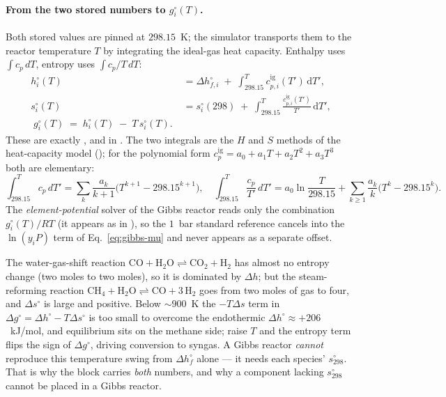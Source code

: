\documentclass[11pt,a4paper]{article}
\begin{document}
\paragraph{From the two stored numbers to $g^{\circ}_i(T)$.}
Both stored values are pinned at $298.15$~K; the simulator transports
them to the reactor temperature $T$ by integrating the ideal-gas heat
capacity.  Enthalpy uses $\int c_p\,dT$, entropy uses
$\int c_p/T\,dT$:
\begin{align}
   h^{\circ}_i(T) &= \Delta h^{\circ}_{f,i}
        \;+\; \int_{298.15}^{T} c_{p,i}^{\mathrm{ig}}(T')\,\mathrm{d}T',
        \label{eq:gibbs-h-of-T}\\[2pt]
   s^{\circ}_i(T) &= s^{\circ}_{i}(298)
        \;+\; \int_{298.15}^{T} \frac{c_{p,i}^{\mathrm{ig}}(T')}{T'}\,\mathrm{d}T',
        \label{eq:gibbs-s-of-T}\\[2pt]
   \boxed{\;g^{\circ}_i(T) \;=\; h^{\circ}_i(T) \;-\; T\,s^{\circ}_i(T).\;}
        \label{eq:gibbs-g-of-T}
\end{align}
These are exactly ,
 and
 in
.  The two integrals are the $H$ and $S$
methods of the heat-capacity model
(); for the polynomial form
$c_p^{\mathrm{ig}} = a_0 + a_1 T + a_2 T^2 + a_3 T^3$ both are
elementary:
\begin{equation*}
   \int_{298.15}^{T}\!\! c_p\,dT' = \sum_k \frac{a_k}{k+1}\bigl(T^{k+1} - 298.15^{k+1}\bigr),
   \quad
   \int_{298.15}^{T}\!\! \frac{c_p}{T'}\,dT' =
     a_0 \ln\frac{T}{298.15} + \sum_{k\ge 1} \frac{a_k}{k}\bigl(T^{k} - 298.15^{k}\bigr).
\end{equation*}
The \emph{element-potential} solver of the Gibbs reactor reads only the
combination $g^{\circ}_i(T)/RT$ (it appears as 
in ), so the $1$~bar standard
reference cancels into the $\ln(y_iP)$ term of
Eq.~\eqref{eq:gibbs-mu} and never appears as a separate offset.

\begin{example}
The water-gas-shift reaction $\mathrm{CO} + \mathrm{H_2O}
\rightleftharpoons \mathrm{CO_2} + \mathrm{H_2}$ has almost no entropy
change (two moles to two moles), so it is dominated by $\Delta h$; but
the steam-reforming reaction $\mathrm{CH_4} + \mathrm{H_2O}
\rightleftharpoons \mathrm{CO} + 3\,\mathrm{H_2}$ goes from two moles of
gas to four, and $\Delta s^{\circ}$ is large and positive.  Below
$\sim 900$~K the $-T\Delta s$ term in $\Delta g^{\circ} =
\Delta h^{\circ} - T\Delta s^{\circ}$ is too small to overcome the
endothermic $\Delta h^{\circ} \approx +206$~kJ/mol, and equilibrium sits
on the methane side; raise $T$ and the entropy term flips the sign of
$\Delta g^{\circ}$, driving conversion to syngas.  A Gibbs reactor
\emph{cannot} reproduce this temperature swing from
$\Delta h^{\circ}_f$ alone --- it needs each species'
$s^{\circ}_{298}$.  That is why the  block carries
\emph{both} numbers, and why a component lacking $s^{\circ}_{298}$
cannot be placed in a Gibbs reactor.
\end{example}
\end{document}
